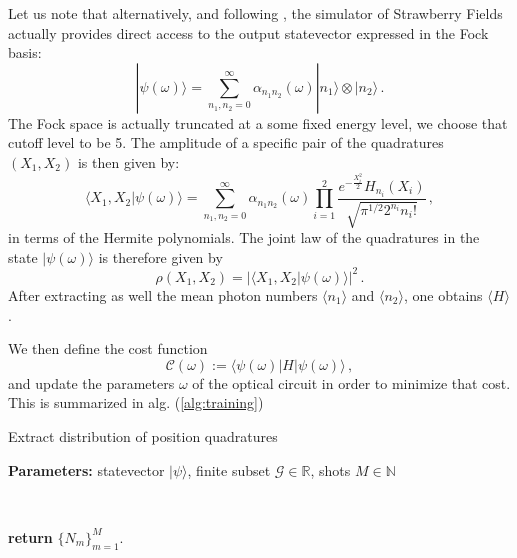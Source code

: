 \documentclass[reprint, amsmath, amssymb, aps, pra]{revtex4-2}
\begin{document}
    Let us note that alternatively, and following \cite{arrazola2019machine}, the simulator of Strawberry Fields actually provides direct access to the output statevector expressed in the Fock basis:
    \begin{equation}
        |\psi(\omega)\rangle = \sum_{n_1,n_2=0}^\infty \alpha_{n_1n_2}(\omega)|n_1\rangle\otimes|n_2\rangle\,.
    \end{equation}
    The Fock space is actually truncated at a some fixed energy level, we choose that cutoff level to be 5.
    The amplitude of a specific pair of the quadratures $(X_1, X_2)$ is then given by:
    \begin{equation}
        \langle X_1,X_2|\psi(\omega)\rangle = \sum_{n_1,n_2=0}^\infty \alpha_{n_1n_2}(\omega)\prod_{i=1}^{2}\frac{e^{-\frac{X_i^2}{2}}H_{n_i}(X_i)}{\sqrt{\pi^{1/2}2^{n_i}n_i!}}\,,
    \end{equation}
    in terms of the Hermite polynomials. The joint law of the quadratures in the state $|\psi(\omega)\rangle$ is therefore given by
    \begin{equation}
        \rho(X_1,X_{2}) = \left|\langle X_1,X_2|\psi(\omega)\rangle\right|^2\,.
    \end{equation}
    After extracting as well the mean photon numbers $\langle n_1\rangle$ and $\langle n_2\rangle$, one obtains $\langle H\rangle$.

    We then define the cost function
    \begin{equation}
    \label{eq:definition_cost}
        \mathcal C(\omega) := \langle\psi(\omega)|H|\psi(\omega)\rangle\,,
    \end{equation}
    and update the parameters $\omega$ of the optical circuit in order to minimize that cost. This is summarized in alg. (\ref{alg:training})

    \begin{algorithm}
        \caption{Extract distribution of position quadratures}\label{alg:statistics_computation}
            \textbf{Parameters:} statevector $|\psi\rangle$, finite subset $\mathcal {G}\in\mathbb R$, shots $M\in\mathbb N$

            \

            \textbf{return} $\{N_m\}_{m=1}^M$.
    \end{algorithm}
\end{document}
